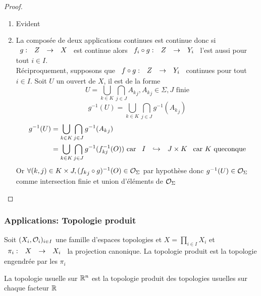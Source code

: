 \documentclass[]{report}
\begin{document}
    \begin{proof}{}{}
        \begin{enumerate}
            \item Evident
            \item La composée de deux applications continues est continue donc si $\begin{array}{ccccc} g : & Z & \to & X \end{array}$ est continue alors $\begin{array}{ccccc} f_i\circ g : & Z & \to & Y_i \end{array}$ l'est aussi pour tout $i\in I$.\\
            Réciproquement, supposons que $\begin{array}{ccccc} f\circ g : & Z & \to & Y_i \end{array}$ continues pour tout $i\in I$. Soit $U$ un ouvert de $X$, il est de la forme 
            \[U=\bigcup_{k\in K}\bigcap_{j\in J}{A_k}_j,{A_k}_j\in\Sigma, J\text{ finie}\]
            \[g^{-1}(U)=\bigcup_{k\in K}\bigcap_{j\in J}g^{-1}({A_k}_j)\]
            \begin{align*}
                g^{-1}(U)&=\bigcup_{k\in K}\bigcap_{j\in J} g^{-1}({A_k}_j)\\
                &=\bigcup_{k\in K}\bigcap_{j\in J}g^{-1}(f_{kj}^{-1}(O))\text{ car $\begin{array}{ccccc} I & \hookrightarrow & J\times K \end{array}$ car $K$ queconque}
            \end{align*}
            Or $\forall (k,j)\in K\times J,({f_k}_j\circ g)^{-1}(O)\in \mathcal{O}_\Sigma$ par hypothèse donc $g^{-1}(U)\in \mathcal{O}_\Sigma$ comme intersection finie et union d'éléments de $\mathcal{O}_\Sigma$
        \end{enumerate}
    \end{proof}

    \subsubsection*{Applications: Topologie produit}

    \begin{df}{}{}
        Soit $(X_i,\mathcal{O}_i)_{i\in I}$ une famille d'espaces topologies et $X=\prod_{i\in I} X_i$ et $\begin{array}{ccccc} \pi_i : & X & \to & X_i \end{array}$ la projection canonique. La topologie produit est la topologie engendrée par les $\pi_i$
    \end{df}

    \begin{ex}{}{}
        La topologie usuelle sur $\mathbb{R}^n$ est la topologie produit des topologies usuelles sur chaque facteur $\mathbb{R}$
    \end{ex}
\end{document}

